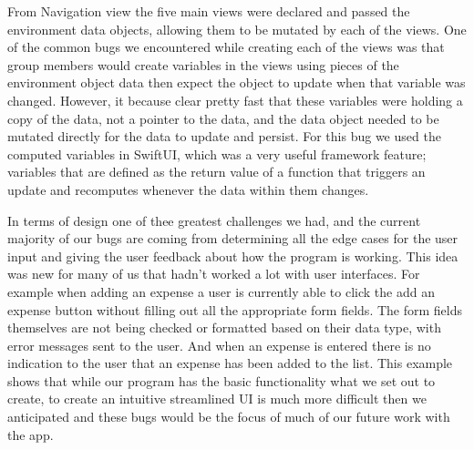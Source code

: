 \documentclass{article}
\begin{document}
  \vskip 0.2in 
  
From Navigation view the five main views were declared and passed the environment data objects, allowing them to be mutated by each of the views. One of the common bugs we encountered while creating each of the views was that group members would create variables in the views using pieces of the environment object data then expect the object to update when that variable was changed. However, it because clear pretty fast that these variables were holding a copy of the data, not a pointer to the data, and the data object needed to be mutated directly for the data to update and persist. For this bug we used the computed variables in SwiftUI, which was a very useful framework feature; variables that are defined as the return value of a function that triggers an update and recomputes whenever the data within them changes. \par

  \vskip 0.2in 
 
 In terms of design one of thee greatest challenges we had, and the current majority of our bugs are coming from determining all the edge cases for the user input and giving the user feedback about how the program is working. This idea was new for many of us that hadn't worked a lot with user interfaces. For example when adding an expense a user is currently able to click the add an expense button without filling out all the appropriate form fields. The form fields themselves are not being checked or formatted based on their data type, with error messages sent to the user. And when an expense is entered there is no indication to the user that an expense has been added to the list. This example shows that while our program has the basic functionality what we set out to create, to create an intuitive streamlined UI is much more difficult then we anticipated and these bugs would be the focus of much of our future work with the app.
 
\end{document}
